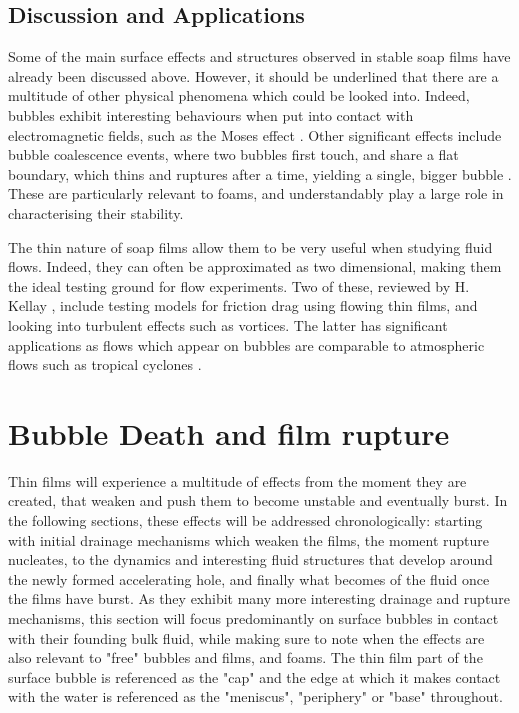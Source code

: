 \documentclass[a4paper,12pt]{article}
\numberwithin{equation}{section}
\numberwithin{figure}{section}
\numberwithin{table}{section}
\begin{document}
\subsection{Discussion and Applications}
Some of the main surface effects and structures observed in stable soap films have already been discussed above. However, it should be underlined that there are a multitude of other physical phenomena which could be looked into. Indeed, bubbles exhibit interesting behaviours when put into contact with electromagnetic fields, such as the Moses effect \cite{Wilson1925, Legchenkova2018}. Other significant effects include bubble coalescence events, where two bubbles first touch, and share a flat boundary, which thins and ruptures after a time, yielding a single, bigger bubble \cite{Pfeiffer2020}. These are particularly relevant to foams, and understandably play a large role in characterising their stability.

The thin nature of soap films allow them to be very useful when studying fluid flows. Indeed, they can often be approximated as two dimensional, making them the ideal testing ground for flow experiments. Two of these, reviewed by H. Kellay \cite{Kellay2017}, include testing models for friction drag using flowing thin films, and looking into turbulent effects such as vortices. The latter has significant applications as flows which appear on bubbles are comparable to atmospheric flows such as tropical cyclones \cite{Seychelles2008}.

\newpage
\section{Bubble Death and film rupture}
Thin films will experience a multitude of effects from the moment they are created, that weaken and push them to become unstable and eventually burst. In the following sections, these effects will be addressed chronologically: starting with initial drainage mechanisms which weaken the films, the moment rupture nucleates, to the dynamics and interesting fluid structures that develop around the newly formed accelerating hole, and finally what becomes of the fluid once the films have burst. As they exhibit many more interesting drainage and rupture mechanisms, this section will focus predominantly on surface bubbles in contact with their founding bulk fluid, while making sure to note when the effects are also relevant to "free" bubbles and films, and foams. The thin film part of the surface bubble is referenced as the "cap" and the edge at which it makes contact with the water is referenced as the "meniscus", "periphery" or "base" throughout.
\end{document}
